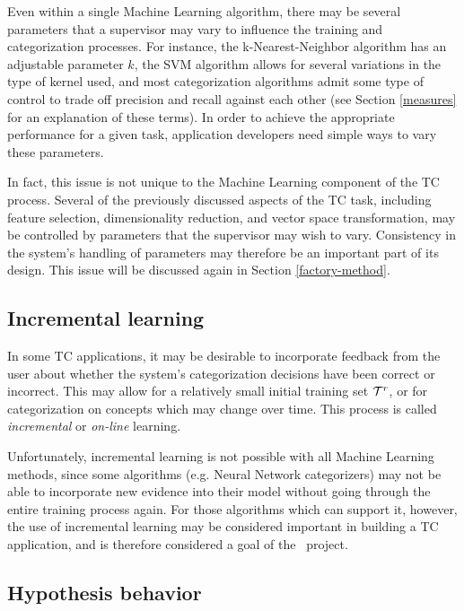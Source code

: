 Even within a single Machine Learning algorithm, there may be several
parameters that a supervisor may vary to influence the training and
categorization processes.  For instance, the k-Nearest-Neighbor
algorithm has an adjustable parameter $k$, the SVM algorithm allows
for several variations in the type of kernel used, and most
categorization algorithms admit some type of control to trade off
precision and recall against each other (see Section \ref{measures}
for an explanation of these terms).  In order to achieve the
appropriate performance for a given task, application developers need
simple ways to vary these parameters.

In fact, this issue is not unique to the Machine Learning component of
the TC process.  Several of the previously discussed aspects of the TC
task, including feature selection, dimensionality reduction, and
vector space transformation, may be controlled by parameters that the
supervisor may wish to vary.  Consistency in the system's handling of
parameters may therefore be an important part of its design.  This
issue will be discussed again in Section \ref{factory-method}.

\subsection{Incremental learning}

In some TC applications, it may be desirable to incorporate feedback
from the user about whether the system's categorization decisions have
been correct or incorrect.\cite[p. 28]{sebastiani:02} This may allow
for a relatively small initial training set $\mathcal{T}^r$, or for
categorization on concepts which may change over time.  This process
is called \emph{incremental} or \emph{on-line} learning.

Unfortunately, incremental learning is not possible with all Machine
Learning methods, since some algorithms (e.g. Neural Network
categorizers) may not be able to incorporate new evidence into their
model without going through the entire training process again.  For
those algorithms which can support it, however, the use of incremental
learning may be considered important in building a TC application, and
is therefore considered a goal of the \aicat\ project.

\subsection{Hypothesis behavior}
\label{Hypothesis behavior}

